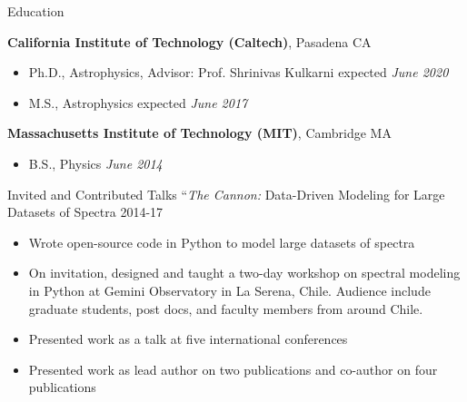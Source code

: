 \documentclass{resume} %
\begin{document}

\begin{rSection}{Education}

{\bf California Institute of Technology (Caltech)}, Pasadena CA
\begin{itemize}
\item Ph.D., Astrophysics, 
  Advisor: Prof. Shrinivas Kulkarni \hfill expected {\em June 2020}
\end{itemize}

\begin{itemize}
  \item M.S., Astrophysics \hfill expected {\em June 2017}
\end{itemize}

{\bf Massachusetts Institute of Technology (MIT)}, Cambridge MA
\begin{itemize}
\item B.S., Physics \hfill {\em June 2014}
\end{itemize}

\end{rSection}



\begin{rSection}{Invited and Contributed Talks}
``\emph{The Cannon:} Data-Driven Modeling for Large Datasets of Spectra
\hfill 2014-17
\begin{itemize}
  \item
    Wrote open-source code in Python to model large datasets of spectra
  \item
    On invitation, designed and taught a two-day workshop on spectral modeling
    in Python at Gemini Observatory in La Serena, Chile. 
    Audience include graduate students, post docs, and faculty members from
    around Chile.
  \item
    Presented work as a talk at five international conferences
  \item
    Presented work as lead author on two publications and 
    co-author on four publications
\end{itemize}

\end{rSection}
\end{document}
